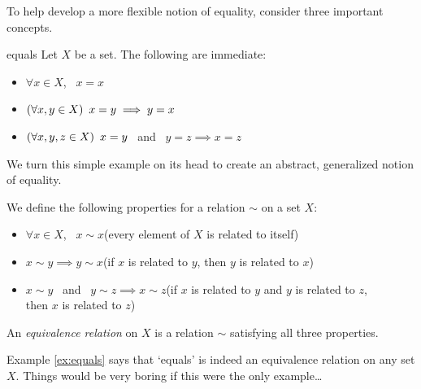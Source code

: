 To help develop a more flexible notion of equality, consider three important concepts.

\begin{example}{}{equals}
	Let $X$ be a set. The following are immediate:
	\begin{itemize}\itemsep1pt
	  \item[] $\forall x\in X$, \ $x=x$
		\item[]\eqsymm $(\forall x,y\in X)\lstsp x=y\implies y=x$
		\item[]\eqtrans $(\forall x,y,z\in X)\lstsp x=y$ \ and \ $y=z\implies x=z$
	\end{itemize}
\end{example}

We turn this simple example on its head to create an abstract, generalized notion of equality.

\begin{defn}{}{}
	We define the following properties for a relation\footnotemark{} $\sim$ on a set $X$:
	\begin{itemize}\itemsep1pt
	  \item[] $\forall x\in X$, \ $x\sim x$\hfill(every element of $X$ is related to itself)
		\item[]\eqsymm $x\sim y\implies y\sim x$\hfill(if $x$ is related to $y$, then $y$ is related to $x$)
		\item[]\eqtrans $x\sim y$ \ and \ $y\sim z\implies x\sim z$\hfill(if $x$ is related to $y$ and $y$ is related to $z$,\\
		\phantom{bob}\hfill then $x$ is related to $z$)
	\end{itemize}
	An \emph{equivalence relation} on $X$ is a relation $\sim$ satisfying all three properties.
\end{defn}


\smallbreak

Example \ref{ex:equals} says that `equals' is indeed an equivalence relation on any set $X$. Things would be very boring if this were the only example\ldots


